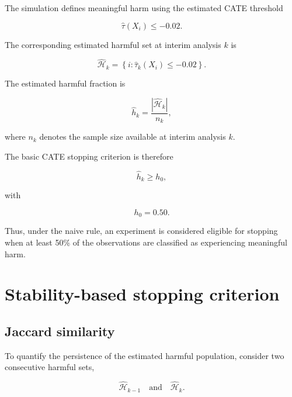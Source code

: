\documentclass[11pt,a4paper]{article}
\begin{document}
The simulation defines meaningful harm using the estimated CATE threshold

\begin{equation}
\widehat{\tau}(X_i)\leq -0.02.
\end{equation}

The corresponding estimated harmful set at interim analysis $k$ is

\begin{equation}
\widehat{\mathcal H}_k
=
\left\{
i:
\widehat{\tau}_k(X_i)\leq -0.02
\right\}.
\end{equation}

The estimated harmful fraction is

\begin{equation}
\widehat h_k
=
\frac{
|\widehat{\mathcal H}_k|
}{
n_k
},
\end{equation}

where $n_k$ denotes the sample size available at interim analysis $k$.

The basic CATE stopping criterion is therefore

\begin{equation}
\widehat h_k\geq h_0,
\end{equation}

with

\begin{equation}
h_0=0.50.
\end{equation}

Thus, under the naive rule, an experiment is considered eligible for stopping
when at least 50\% of the observations are classified as experiencing
meaningful harm.


\section{Stability-based stopping criterion}

\subsection{Jaccard similarity}

To quantify the persistence of the estimated harmful population, consider two
consecutive harmful sets,

\[
\widehat{\mathcal H}_{k-1}
\quad\text{and}\quad
\widehat{\mathcal H}_k.
\]
\end{document}
